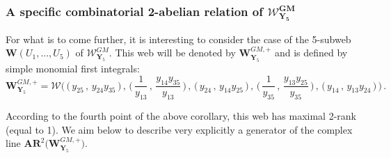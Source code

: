 \documentclass[11pt]{amsart}
\newcommand{\sk}{\smallskip}
\begin{document}











\subsubsection{\bf A specific combinatorial 2-abelian relation of 
$\boldsymbol{\boldsymbol{\mathcal W}_{\boldsymbol{Y}_5}^{GM}}$}
For what is to come further, it is interesting to consider the case of the 5-subweb $\boldsymbol{W}(U_1,\ldots,U_5)$  of $\boldsymbol{\mathcal W}_{\boldsymbol{Y}_5}^{GM}$.  This web will be denoted by $\boldsymbol{W}^{GM,+}_{ \boldsymbol{Y}_5}$ and is defined by simple monomial first integrals: 
\begin{equation*}
\boldsymbol{W}^{GM,+}_{ \boldsymbol{Y}_5}
= 
\boldsymbol{\mathcal W}
\Bigg(\, \Big(\,  {y_{25}}\, , \,   {y_{24}}  {y_{35}}
\, \Big)
\, , \, 
\Big(\,  \frac{1}{y_{13}}\, , \, 
\frac{ {y_{14}}  {y_{35}}}{ {y_{13}}}\, \Big)
\, , \,
  \bigg( 
  \,  {y_{24}}
 \, , \,  
    {y_{14}}  {y_{25}}
   \, \bigg)
\, , \, 
\bigg(\,  \frac{1}{y_{35}}
\, , \, 
\frac{ {y_{13}}  {y_{25}}}{ {y_{35}}}
\,
\bigg)
\, , \, 
 \Big(\,  {y_{14}}
\, , \, 
  {y_{13}}  {y_{24}}
 \, 
\Big) \,\Bigg)\, .
\end{equation*}


 According to the fourth point of the above corollary,  
this web  has maximal 2-rank (equal to 1). We aim below to describe very explicitly a generator of the complex line $\boldsymbol{AR}^2\big(\boldsymbol{W}^{GM,+}_{ \boldsymbol{Y}_5})$.
\sk 
 
%
%
\end{document}
